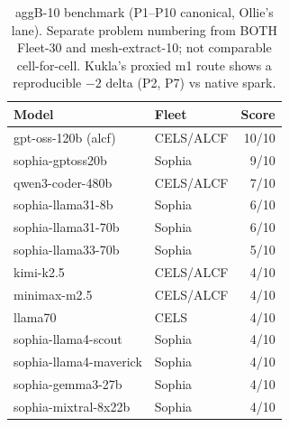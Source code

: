 \begin{table}[t]
  \centering
  \caption{aggB-10 benchmark (P1--P10 canonical, Ollie's lane). Separate
    problem numbering from BOTH Fleet-30 and mesh-extract-10; not comparable
    cell-for-cell. Kukla's proxied m1 route shows a reproducible $-2$ delta
    (P2, P7) vs native spark.}
  \label{tab:aggb10}
  \begin{tabular}{llr}
    \toprule
    Model & Fleet & Score \\
    \midrule
    gpt-oss-120b (alcf)     & CELS/ALCF & 10/10 \\
    sophia-gptoss20b        & Sophia    & 9/10 \\
    qwen3-coder-480b        & CELS/ALCF & 7/10 \\
    sophia-llama31-8b       & Sophia    & 6/10 \\
    sophia-llama31-70b      & Sophia    & 6/10 \\
    sophia-llama33-70b      & Sophia    & 5/10 \\
    kimi-k2.5               & CELS/ALCF & 4/10 \\
    minimax-m2.5            & CELS/ALCF & 4/10 \\
    llama70                 & CELS      & 4/10 \\
    sophia-llama4-scout     & Sophia    & 4/10 \\
    sophia-llama4-maverick  & Sophia    & 4/10 \\
    sophia-gemma3-27b       & Sophia    & 4/10 \\
    sophia-mixtral-8x22b    & Sophia    & 4/10 \\
    \bottomrule
  \end{tabular}
\end{table}
